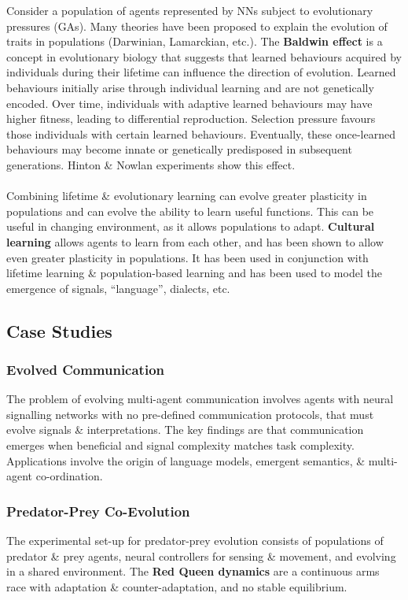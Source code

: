 \documentclass[a4paper,11pt]{article}
\begin{document}
Consider a population of agents represented by NNs subject to evolutionary pressures (GAs).
Many theories have been proposed to explain the evolution of traits in populations (Darwinian, Lamarckian, etc.).
The \textbf{Baldwin effect} is a concept in evolutionary biology that suggests that learned behaviours acquired by individuals during their lifetime can influence the direction of evolution.
Learned behaviours initially arise through individual learning and are not genetically encoded.
Over time, individuals with adaptive learned behaviours may have higher fitness, leading to differential reproduction.
Selection pressure favours those individuals with certain learned behaviours. 
Eventually, these once-learned behaviours may become innate or genetically predisposed in subsequent generations.
Hinton \& Nowlan experiments show this effect.
\\\\
Combining lifetime \& evolutionary learning can evolve greater plasticity in populations and can evolve the ability to learn useful functions.
This can be useful in changing environment, as it allows populations to adapt.
\textbf{Cultural learning} allows agents to learn from each other, and has been shown to allow even greater plasticity in populations.
It has been used in conjunction with lifetime learning \& population-based learning and has been used to model the emergence of signals, ``language'', dialects, etc.

\subsection{Case Studies}
\subsubsection{Evolved Communication}
The problem of evolving multi-agent communication involves agents with neural signalling networks with no pre-defined communication protocols, that must evolve signals \& interpretations.
The key findings are that communication emerges when beneficial and signal complexity matches task complexity.
Applications involve the origin of language models, emergent semantics, \& multi-agent co-ordination.

\subsubsection{Predator-Prey Co-Evolution}
The experimental set-up for predator-prey evolution consists of populations of predator \& prey agents, neural controllers for sensing \& movement, and evolving in a shared environment.
The \textbf{Red Queen dynamics} are a continuous arms race with adaptation \& counter-adaptation, and no stable equilibrium.
\end{document}
